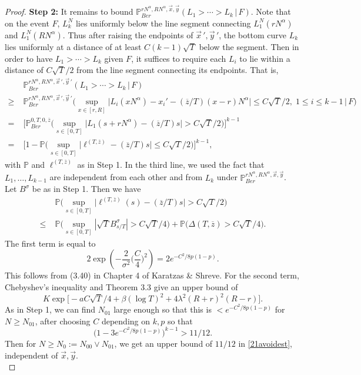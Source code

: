 \documentclass[12pt]{article}
\begin{document}
\begin{proof}
	\noindent\textbf{Step 2:} It remains to bound $\mathbb{P}^{rN^\alpha, RN^\alpha,\vec{x},\vec{y}}_{Ber} (L_1 > \cdots > L_k\,|\,F)$. Note that on the event $F$, $L_k^N$ lies uniformly below the line segment connecting $L_1^N(rN^\alpha)$ and $L_1^N(RN^\alpha)$. Thus after raising the endpoints of $\vec{x}\,',\vec{y}\,'$, the bottom curve $L_k$ lies uniformly at a distance of at least $C(k-1)\sqrt{T}$ below the segment. Then in order to have $L_1 > \cdots > L_k$ given $F$, it suffices to require each $L_i$ to lie within a distance of $C\sqrt{T}/2$ from  the line segment connecting its endpoints. That is,
	\begin{align}
	&\mathbb{P}^{rN^\alpha, RN^\alpha,\vec{x}\,',\vec{y}\,'}_{Ber} (L_1 > \cdots > L_k\,|\,F) \nonumber\\
	\geq \; & \mathbb{P}^{rN^\alpha, RN^\alpha,\vec{x}\,',\vec{y}\,'}_{Ber} \Big(\sup_{x\in[r,R]} \big|L_i(xN^\alpha) - x_i' - (\overline{z}/T)(x-r)N^\alpha\big| \leq C\sqrt{T}/2, \;1\leq i\leq k-1\,\Big|\,F\Big) \nonumber\\
	= \; & \Big[ \mathbb{P}^{0,T,0,\overline{z}}_{Ber} \Big(\sup_{s\in[0,T]} \big|L_1(s+rN^\alpha) - (\overline{z}/T)s\big| > C\sqrt{T}/2\Big)\Big]^{k-1} \nonumber\\
	= \; & \Big[ 1 - \mathbb{P}\Big(\sup_{s\in[0,T]} \big|\ell^{(T,\overline{z})} - (\overline{z}/T)s\big| \leq C\sqrt{T}/2\Big)\Big]^{k-1}, \label{21avoidest}
	\end{align}
	with $\mathbb{P}$ and $\ell^{(T,\overline{z})}$ as in Step 1. In the third line, we used the fact that $L_1,\dots,L_{k-1}$ are independent from each other and from $L_k$ under $\mathbb{P}^{rN^\alpha, RN^\alpha,\vec{x},\vec{y}}_{Ber}$. Let $B^\sigma$ be as in Step 1. Then we have
	\begin{align*}
	&\mathbb{P} \Big(\sup_{s\in[0,T]} \big|\ell^{(T,\overline{z})}(s) - (\overline{z}/T)s\big| > C\sqrt{T}/2\Big)\\
	\leq \; & \mathbb{P}\Big(\sup_{s\in[0,T]} |\sqrt{T}B^{\sigma}_{s/T}| > C\sqrt{T}/4\Big) + \mathbb{P}\Big(\Delta(T,\overline{z}) > C\sqrt{T}/4\Big).
	\end{align*}
	The first term is equal to
	\[
	2\exp\left(-\frac{2}{\sigma^2}\Big(\frac{C}{4}\Big)^2\right) = 2e^{-C^2/8p(1-p)}.
	\]
	This follows from (3.40) in Chapter 4 of Karatzas \& Shreve. For the second term, Chebyshev's inequality and Theorem 3.3 give an upper bound of
	\[
	K\exp\Big[-aC\sqrt{T}/4 + \beta(\log T)^2 + 4\lambda^2(R+r)^2(R-r) \Big].
	\]
	As in Step 1, we can find $N_{01}$ large enough so that this is $<e^{-C^2/8p(1-p)}$ for $N\geq N_{01}$, after choosing $C$ depending on $k,p$ so that
	\begin{equation}
	\big(1-3e^{-C^2/8p(1-p)}\big)^{k-1} > 11/12. \label{21Cineq}
	\end{equation}
	Then for $N\geq N_0 := N_{00} \vee N_{01}$, we get an upper bound of $11/12$ in \eqref{21avoidest}, independent of $\vec{x},\vec{y}$.\\
	

\end{proof}
\end{document}
